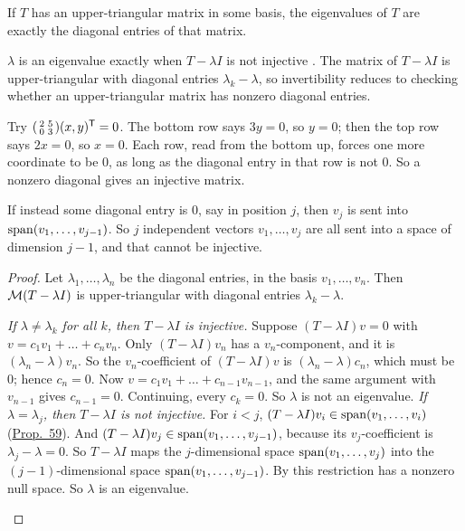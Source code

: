 \documentclass[10pt]{scrartcl}
\begin{document}
\begin{proposition*}\hypertarget{prop-60}{}\label{prop-60}
  If $T$ has an upper-triangular matrix in some basis, the eigenvalues of $T$ are exactly the diagonal entries of that matrix.
\end{proposition*}
\begin{ideabox}
$\lambda$ is an eigenvalue exactly when $T-\lambda I$ is not injective . The matrix of $T-\lambda I$ is upper-triangular with diagonal entries $\lambda_k-\lambda$, so invertibility reduces to checking whether an upper-triangular matrix has nonzero diagonal entries.

Try $\begin{psmallmatrix}2&5\\0&3\end{psmallmatrix}(x,y)^{\mathsf T}=0$. The bottom row says $3y=0$, so $y=0$; then the top row says $2x=0$, so $x=0$. Each row, read from the bottom up, forces one more coordinate to be $0$, as long as the diagonal entry in that row is not $0$. So a nonzero diagonal gives an injective matrix.

If instead some diagonal entry is $0$, say in position $j$, then $v_j$ is sent into $\operatorname{span}(v_1,\dots,v_{j-1})$. So $j$ independent vectors $v_1,\dots,v_j$ are all sent into a space of dimension $j-1$, and that cannot be injective.
\end{ideabox}
\begin{proof}
  Let $\lambda_1,\dots,\lambda_n$ be the diagonal entries, in the basis $v_1,\dots,v_n$. Then $\mathcal M(T-\lambda I)$ is upper-triangular with diagonal entries $\lambda_k-\lambda$.
  \begin{steps}
    \ii \emph{If $\lambda\ne\lambda_k$ for all $k$, then $T-\lambda I$ is injective.} Suppose $(T-\lambda I)v=0$ with $v=c_1v_1+\dots+c_nv_n$. Only $(T-\lambda I)v_n$ has a $v_n$-component, and it is $(\lambda_n-\lambda)v_n$. So the $v_n$-coefficient of $(T-\lambda I)v$ is $(\lambda_n-\lambda)c_n$, which must be $0$; hence $c_n=0$.
    \ii Now $v=c_1v_1+\dots+c_{n-1}v_{n-1}$, and the same argument with $v_{n-1}$ gives $c_{n-1}=0$. Continuing, every $c_k=0$. So $\lambda$ is not an eigenvalue.
    \ii \emph{If $\lambda=\lambda_j$, then $T-\lambda I$ is not injective.} For $i<j$, $(T-\lambda I)v_i\in\operatorname{span}(v_1,\dots,v_i)$ (\hyperref[prop-59]{Prop.~59}). And $(T-\lambda I)v_j\in\operatorname{span}(v_1,\dots,v_{j-1})$, because its $v_j$-coefficient is $\lambda_j-\lambda=0$.
    \ii So $T-\lambda I$ maps the $j$-dimensional space $\operatorname{span}(v_1,\dots,v_j)$ into the $(j-1)$-dimensional space $\operatorname{span}(v_1,\dots,v_{j-1})$. By  this restriction has a nonzero null space. So $\lambda$ is an eigenvalue.
  \end{steps}
\end{proof}
\end{document}
